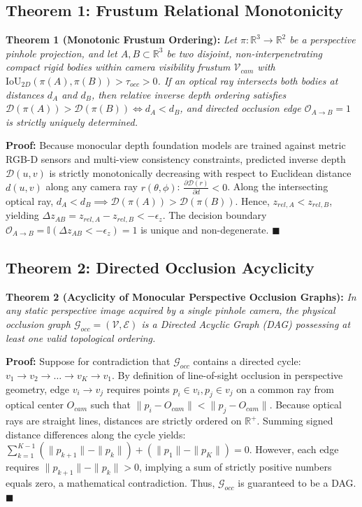 \documentclass[10pt,twocolumn,letterpaper]{article}
\begin{document}
\subsection{Theorem 1: Frustum Relational Monotonicity}
\textbf{Theorem 1 (Monotonic Frustum Ordering):} \textit{Let $\pi: \mathbb{R}^3 \to \mathbb{R}^2$ be a perspective pinhole projection, and let $A, B \subset \mathbb{R}^3$ be two disjoint, non-interpenetrating compact rigid bodies within camera visibility frustum $\mathcal{V}_{cam}$ with $\mathrm{IoU}_{2D}(\pi(A), \pi(B)) > \tau_{occ} > 0$. If an optical ray intersects both bodies at distances $d_A$ and $d_B$, then relative inverse depth ordering satisfies $\mathcal{D}(\pi(A)) > \mathcal{D}(\pi(B)) \iff d_A < d_B$, and directed occlusion edge $\mathcal{O}_{A \to B} = 1$ is strictly uniquely determined.}

\noindent\textbf{Proof:} Because monocular depth foundation models are trained against metric RGB-D sensors and multi-view consistency constraints, predicted inverse depth $\mathcal{D}(u, v)$ is strictly monotonically decreasing with respect to Euclidean distance $d(u, v)$ along any camera ray $r(\theta, \phi)$: $\frac{\partial \mathcal{D}(r)}{\partial d} < 0$. Along the intersecting optical ray, $d_A < d_B \implies \mathcal{D}(\pi(A)) > \mathcal{D}(\pi(B))$. Hence, $z_{rel, A} < z_{rel, B}$, yielding $\Delta z_{AB} = z_{rel, A} - z_{rel, B} < -\epsilon_z$. The decision boundary $\mathcal{O}_{A \to B} = \mathbb{I}(\Delta z_{AB} < -\epsilon_z) = 1$ is unique and non-degenerate. $\blacksquare$

\subsection{Theorem 2: Directed Occlusion Acyclicity}
\textbf{Theorem 2 (Acyclicity of Monocular Perspective Occlusion Graphs):} \textit{In any static perspective image acquired by a single pinhole camera, the physical occlusion graph $\mathcal{G}_{occ} = (\mathcal{V}, \mathcal{E})$ is a Directed Acyclic Graph (DAG) possessing at least one valid topological ordering.}

\noindent\textbf{Proof:} Suppose for contradiction that $\mathcal{G}_{occ}$ contains a directed cycle: $v_1 \to v_2 \to \dots \to v_K \to v_1$. By definition of line-of-sight occlusion in perspective geometry, edge $v_i \to v_j$ requires points $p_i \in v_i, p_j \in v_j$ on a common ray from optical center $O_{cam}$ such that $\|p_i - O_{cam}\| < \|p_j - O_{cam}\|$. Because optical rays are straight lines, distances are strictly ordered on $\mathbb{R}^+$. Summing signed distance differences along the cycle yields: $\sum_{k=1}^{K-1} (\|p_{k+1}\| - \|p_k\|) + (\|p_1\| - \|p_K\|) = 0$. However, each edge requires $\|p_{k+1}\| - \|p_k\| > 0$, implying a sum of strictly positive numbers equals zero, a mathematical contradiction. Thus, $\mathcal{G}_{occ}$ is guaranteed to be a DAG. $\blacksquare$
\end{document}
